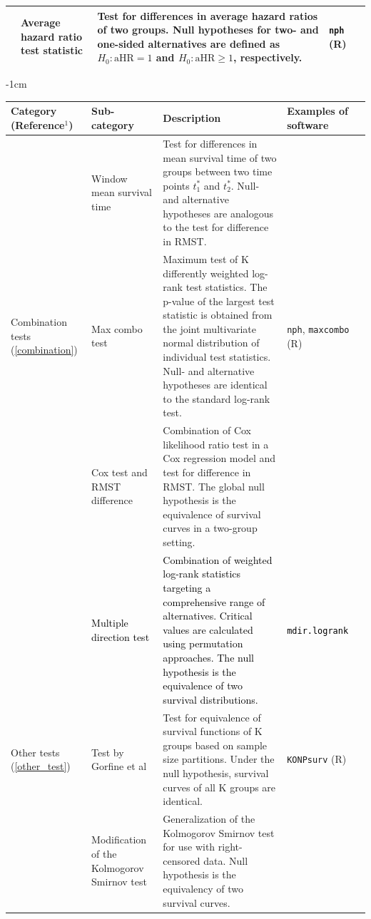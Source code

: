 \documentclass{article}
\newcommand{\NEW}[2][black]{\textcolor{#1}{#2}}
\begin{document}
\begin{center}
\begin{landscape}
\begin{table}[!htbpt!]
\begin{tabulary}{\linewidth} {|L|L|L|L|L|}
& Average hazard ratio test statistic & Test for differences in average hazard ratios of two groups. Null hypotheses for two- and one-sided alternatives are defined as $H_0: \text{aHR} = 1$ and $H_0: \text{aHR} \geq 1$, respectively. & \texttt{nph} (R) \\
\hline
\end{tabulary}
\end{table}
\newpage
\begin{table}[!htbpt!]
   \centering
    \small
    \addtolength{\leftskip} {-1cm}
    \addtolength{\rightskip}{-1cm}
     \begin{tabulary}{\linewidth} {|L|L|L|L|L|}
 \hline
 Category (Reference$^1$) & Sub-category & Description & Examples of software \\
 \hline \hline
& Window mean survival time & Test for differences in mean survival time of two groups between two time points $t_1^*$ and $t_2^*$. Null- and alternative hypotheses are analogous to the test for difference in RMST.  &  \\
\hline
Combination tests (\ref{combination}) & Max combo test & Maximum test of K differently weighted log-rank test statistics. The p-value of the largest test statistic is obtained from the joint multivariate normal distribution of individual test statistics. Null- and alternative hypotheses are identical to the standard log-rank test.  & \texttt{nph}, \texttt{maxcombo} (R) \\
& Cox test and RMST difference & Combination of Cox likelihood ratio test in a Cox regression model and test for difference in RMST. The global null hypothesis is the equivalence of survival curves in a two-group setting. &  \\
& \NEW{Multiple direction test} & \NEW{Combination of weighted log-rank statistics targeting a comprehensive range of alternatives. Critical values are calculated using permutation approaches. The null hypothesis is the equivalence of two survival distributions. }  & \NEW{\texttt{mdir.logrank}} \\
\hline
Other tests (\ref{other_test}) & Test by Gorfine et al & Test for equivalence of survival functions of K groups based on sample size partitions. Under the null hypothesis, survival curves of all K groups are identical. & \texttt{KONPsurv} (R) \\
& Modification of the Kolmogorov Smirnov test  & Generalization of the Kolmogorov Smirnov test for use with right-censored data. Null hypothesis is the equivalency of two survival curves. &   \\

\end{tabulary}
\end{table}
\end{landscape}
\end{center}
\end{document}
